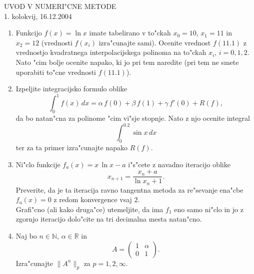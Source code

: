 \documentclass[12pt,a4paper]{article}
\def\RR{\mathbb{R}}
\def\NN{\mathbb{N}}
\begin{document}
\begin{center}
  {\large UVOD V NUMERI"CNE METODE\\
    1. kolokvij, 16.12.2004\\
    }
\end{center}
\vspace{2cm}

\begin{enumerate}

  \item Funkcijo $f(x)=\ln{x}$ imate tabelirano v 
    to"ckah $x_0=10$, $x_1=11$ in $x_2=12$ (vrednosti 
    $f(x_i)$ izra"cunajte sami). Ocenite vrednost $f(11.1)$
    z vrednostjo kvadratnega interpolacijskega polinoma 
    na to"ckah $x_i$, $i=0,1,2$. Nato "cim bolje ocenite napako, ki jo
    pri tem naredite (pri tem ne smete uporabiti to"cne
    vrednosti $f(11.1)$).
    
  \item Izpeljite integracijsko formulo oblike
    $$\int_{0}^1 f(x)\,dx=\alpha\,f(0)+\beta\,f(1)+\gamma\,f'(0)+R(f),$$
    da bo natan"cna za polinome "cim vi"sje stopnje. Nato 
    z njo ocenite integral
    $$\int_{0}^{0.2}\sin{x}\,dx$$
    ter za ta primer izra"cunajte napako $R(f)$.
   
  \item Ni"clo funkcije $f_a(x)=x\,\ln{x}-a$ i"s"cete z navadno iteracijo
   oblike
   $$x_{n+1}=\frac{x_{n}+a}{\ln{x_n}+1}.$$
   Preverite, da je ta iteracija ravno tangentna metoda  za re"sevanje
   ena"cbe $f_a(x)=0$ z redom konvergence vsaj $2$.\\
   Grafi"cno (ali kako druga"ce) utemeljite, da ima $f_1$ eno samo
   ni"clo in jo z zgornjo iteracijo dolo"cite na tri decimalna mesta 
   natan"cno.
  
  \item Naj bo $n\in\NN$, $\alpha\in\RR$ in 
    $$A=\left(
      \begin{array}{cc}
        1 & \alpha \\
        0 & 1
      \end{array}\right).
    $$
    Izra"cunajte $\|A^n\|_p$ za $p=1,2,\infty$.


\end{enumerate}
\end{document}
